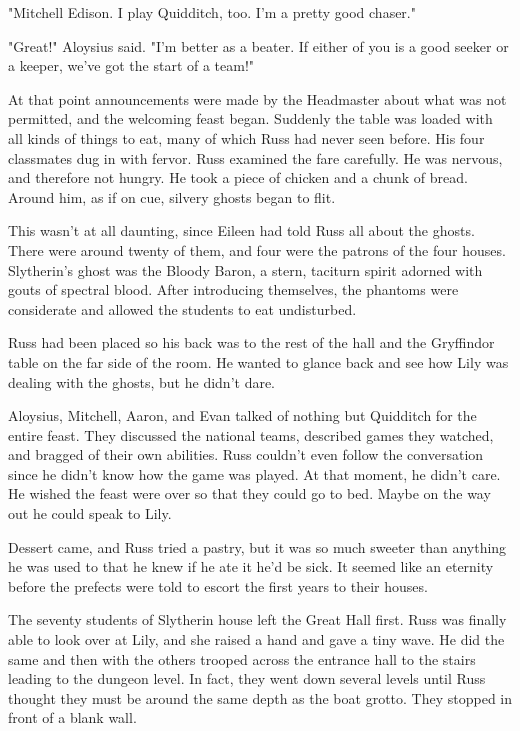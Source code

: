 "Mitchell Edison. I play Quidditch, too. I'm a pretty good chaser."

"Great!" Aloysius said. "I'm better as a beater. If either of you is a good seeker or a keeper, we've got the start of a team!"

At that point announcements were made by the Headmaster about what was not permitted, and the welcoming feast began. Suddenly the table was loaded with all kinds of things to eat, many of which Russ had never seen before. His four classmates dug in with fervor. Russ examined the fare carefully. He was nervous, and therefore not hungry. He took a piece of chicken and a chunk of bread. Around him, as if on cue, silvery ghosts began to flit.

This wasn't at all daunting, since Eileen had told Russ all about the ghosts. There were around twenty of them, and four were the patrons of the four houses. Slytherin's ghost was the Bloody Baron, a stern, taciturn spirit adorned with gouts of spectral blood. After introducing themselves, the phantoms were considerate and allowed the students to eat undisturbed.

Russ had been placed so his back was to the rest of the hall and the Gryffindor table on the far side of the room. He wanted to glance back and see how Lily was dealing with the ghosts, but he didn't dare.

Aloysius, Mitchell, Aaron, and Evan talked of nothing but Quidditch for the entire feast. They discussed the national teams, described games they watched, and bragged of their own abilities. Russ couldn't even follow the conversation since he didn't know how the game was played. At that moment, he didn't care. He wished the feast were over so that they could go to bed. Maybe on the way out he could speak to Lily.

Dessert came, and Russ tried a pastry, but it was so much sweeter than anything he was used to that he knew if he ate it he'd be sick. It seemed like an eternity before the prefects were told to escort the first years to their houses.

The seventy students of Slytherin house left the Great Hall first. Russ was finally able to look over at Lily, and she raised a hand and gave a tiny wave. He did the same and then with the others trooped across the entrance hall to the stairs leading to the dungeon level. In fact, they went down several levels until Russ thought they must be around the same depth as the boat grotto. They stopped in front of a blank wall.

